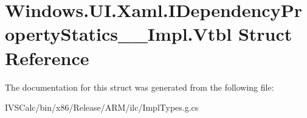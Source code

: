 \hypertarget{struct_windows_1_1_u_i_1_1_xaml_1_1_i_dependency_property_statics_____impl_1_1_vtbl}{}\section{Windows.\+U\+I.\+Xaml.\+I\+Dependency\+Property\+Statics\+\_\+\+\_\+\+Impl.\+Vtbl Struct Reference}
\label{struct_windows_1_1_u_i_1_1_xaml_1_1_i_dependency_property_statics_____impl_1_1_vtbl}


The documentation for this struct was generated from the following file\+:\begin{DoxyCompactItemize}
\item 
I\+V\+S\+Calc/bin/x86/\+Release/\+A\+R\+M/ilc/Impl\+Types.\+g.\+cs\end{DoxyCompactItemize}
